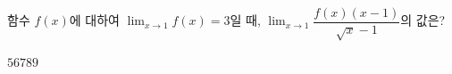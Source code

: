 함수 $f(x)$에 대하여 $\displaystyle\lim_{x\to 1} f(x)=3$일 때, $\displaystyle\lim_{x\to 1}\dfrac{f(x)(x-1)}{\sqrt{x}-1}$의 값은?
\begin{choices32}{$5$}{$6$}{$7$}{$8$}{$9$}\end{choices32}
